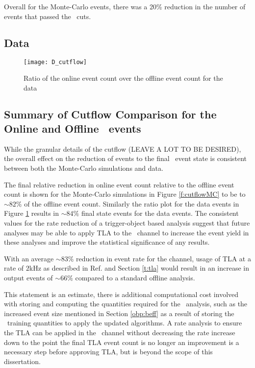     Overall for the Monte-Carlo events, there was a 20\% reduction in the number of events that passed the \VBFHBB\, cuts.




    \subsection{Data}
        \begin{figure}[h]
            \centering
            \texttt{[image: D\_cutflow]}
            \caption[\VBFHBB\ Cutflow ratio for data]{Ratio of the online event count over the offline event count for the data}
            \label{f:cutflowD}
        \end{figure}


    \subsection{Summary of Cutflow Comparison for the Online and Offline \VBFHBB\ events}

    While the granular details of the cutflow (LEAVE A LOT TO BE DESIRED), the overall effect on the reduction of events to the final \VBFHBB\ event state is consistent between both the Monte-Carlo simulations and data.

    The final relative reduction in online event count relative to the offline event count is shown for the Monte-Carlo simulations in Figure \ref{f:cutflowMC} to be to $\sim82\%$ of the offline event count. Similarly the ratio plot for the data events in Figure \ref{f:cutflowD} results in $\sim84\%$ final state events for the data events. The consistent values for the rate reduction of a trigger-object based analysis suggest that future analyses may be able to apply TLA to the \VBFHBB\ channel to increase the event yield in these analyses and improve the statistical significance of any results.

    With an average $\sim83\%$ reduction in event rate for the channel, usage of TLA at a rate of $2$kHz as described in Ref. \cite{TLA} and Section \ref{t:tla} would result in an increase in output events of $\sim66\%$ compared to a standard offline analysis.

    This statement is an estimate, there is additional computational cost involved with storing and computing the quantities required for the \VBFHBB\ analysis, such as the increased event size mentioned in Section \ref{obp:beff} as a result of storing the \btag\ training quantities to apply the updated algorithms. A rate analysis to ensure the TLA can be applied in the \VBFHBB\ channel without decreasing the rate increase down to the point the final TLA event count is no longer an improvement is a necessary step before approving TLA, but is beyond the scope of this dissertation.


